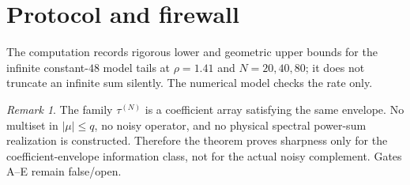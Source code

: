 \documentclass[11pt]{article}
\theoremstyle{remark}\newtheorem{remark}[theorem]{Remark}
\begin{document}
\section{Protocol and firewall}
The computation records rigorous lower and geometric upper bounds for the
infinite constant-$48$ model tails at $\rho=1.41$ and $N=20,40,80$; it does
not truncate an infinite sum silently.  The numerical model checks the rate
only.

\begin{remark}
The family $\tau^{(N)}$ is a coefficient array satisfying the same envelope.
No multiset in $|\mu|\le q$, no noisy operator, and no physical spectral
power-sum realization is constructed.  Therefore the theorem proves
sharpness only for the coefficient-envelope information class, not for the
actual noisy complement.  Gates A--E remain false/open.
\end{remark}
\end{document}
